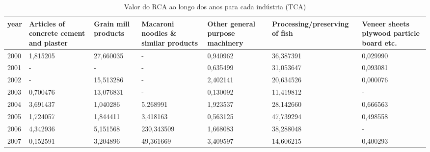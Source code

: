 \begin{table}
\centering
\caption{Valor do RCA ao longo dos anos para cada indústria (TCA)}
\begin{tabular}{p{1cm}p{2cm}p{2cm}p{2cm}p{2cm}p{2cm}p{2cm}}
\toprule
 year &  Articles of concrete cement and plaster &  Grain mill products &  Macaroni noodles \& similar products &  Other general purpose machinery &  Processing/preserving of fish &  Veneer sheets plywood particle board etc. \\
\midrule
 2000 &                                 1,815205 &            27,660035 &                                    - &                         0,940962 &                      36,387391 &                                   0,029990 \\
 2001 &                                        - &                    - &                                    - &                         0,635499 &                      31,053647 &                                   0,093081 \\
 2002 &                                        - &            15,513286 &                                    - &                         2,402141 &                      20,634526 &                                   0,000076 \\
 2003 &                                 0,700476 &            13,076831 &                                    - &                         0,130092 &                      11,419812 &                                          - \\
 2004 &                                 3,691437 &             1,040286 &                             5,268991 &                         1,923537 &                      28,142660 &                                   0,666563 \\
 2005 &                                 1,724057 &             1,844411 &                             3,418163 &                         0,563125 &                      47,739294 &                                   0,498558 \\
 2006 &                                 4,342936 &             5,151568 &                           230,343509 &                         1,668083 &                      38,288048 &                                          - \\
 2007 &                                 0,152591 &             3,204896 &                            49,361669 &                         3,409597 &                      14,606215 &                                   0,400293 \\

\end{tabular}
\end{table}
